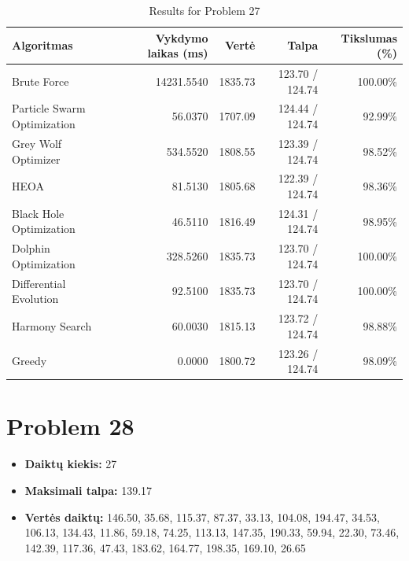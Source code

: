 \documentclass[a4paper,11pt]{article}
\begin{document}
\begin{table}[h!]
\centering
\begin{tabular}{lrrrr}
\toprule
\textbf{Algoritmas} & \textbf{Vykdymo laikas (ms)} & \textbf{Vertė} & \textbf{Talpa} & \textbf{Tikslumas (\%)} \\
\midrule
Brute Force & 14231.5540 & 1835.73 & 123.70 / 124.74 & 100.00\% \\
Particle Swarm Optimization & 56.0370 & 1707.09 & 124.44 / 124.74 & 92.99\% \\
Grey Wolf Optimizer & 534.5520 & 1808.55 & 123.39 / 124.74 & 98.52\% \\
HEOA & 81.5130 & 1805.68 & 122.39 / 124.74 & 98.36\% \\
Black Hole Optimization & 46.5110 & 1816.49 & 124.31 / 124.74 & 98.95\% \\
Dolphin Optimization & 328.5260 & 1835.73 & 123.70 / 124.74 & 100.00\% \\
Differential Evolution & 92.5100 & 1835.73 & 123.70 / 124.74 & 100.00\% \\
Harmony Search & 60.0030 & 1815.13 & 123.72 / 124.74 & 98.88\% \\
Greedy & 0.0000 & 1800.72 & 123.26 / 124.74 & 98.09\% \\
\bottomrule
\end{tabular}
\caption{Results for Problem 27}
\end{table}
\clearpage

\section*{Problem 28}
\begin{itemize}
    \item \textbf{Daiktų kiekis:} 27
    \item \textbf{Maksimali talpa:} 139.17
    \item \textbf{Vertės daiktų:} 146.50, 35.68, 115.37, 87.37, 33.13, 104.08, 194.47, 34.53, 106.13, 134.43, 11.86, 59.18, 74.25, 113.13, 147.35, 190.33, 59.94, 22.30, 73.46, 142.39, 117.36, 47.43, 183.62, 164.77, 198.35, 169.10, 26.65
\end{itemize}
\end{document}
